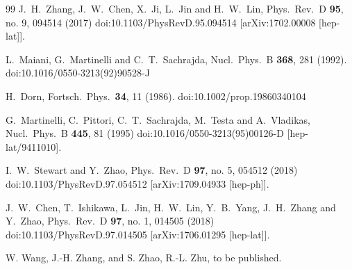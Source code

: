 \begin{thebibliography}{99}
  J.~H.~Zhang, J.~W.~Chen, X.~Ji, L.~Jin and H.~W.~Lin,
  Phys.\ Rev.\ D {\bf 95}, no. 9, 094514 (2017)
  doi:10.1103/PhysRevD.95.094514
  [arXiv:1702.00008 [hep-lat]].


  L.~Maiani, G.~Martinelli and C.~T.~Sachrajda,
  Nucl.\ Phys.\ B {\bf 368}, 281 (1992).
  doi:10.1016/0550-3213(92)90528-J

  H.~Dorn,
  Fortsch.\ Phys.\  {\bf 34}, 11 (1986).
  doi:10.1002/prop.19860340104


  G.~Martinelli, C.~Pittori, C.~T.~Sachrajda, M.~Testa and A.~Vladikas,
  Nucl.\ Phys.\ B {\bf 445}, 81 (1995)
  doi:10.1016/0550-3213(95)00126-D
  [hep-lat/9411010].

  I.~W.~Stewart and Y.~Zhao,
  Phys.\ Rev.\ D {\bf 97}, no. 5, 054512 (2018)
  doi:10.1103/PhysRevD.97.054512
  [arXiv:1709.04933 [hep-ph]].


  J.~W.~Chen, T.~Ishikawa, L.~Jin, H.~W.~Lin, Y.~B.~Yang, J.~H.~Zhang and Y.~Zhao,
  Phys.\ Rev.\ D {\bf 97}, no. 1, 014505 (2018)
  doi:10.1103/PhysRevD.97.014505
  [arXiv:1706.01295 [hep-lat]].


W. Wang, J.-H. Zhang, and S. Zhao, R.-L. Zhu, to be published.

\end{thebibliography}
